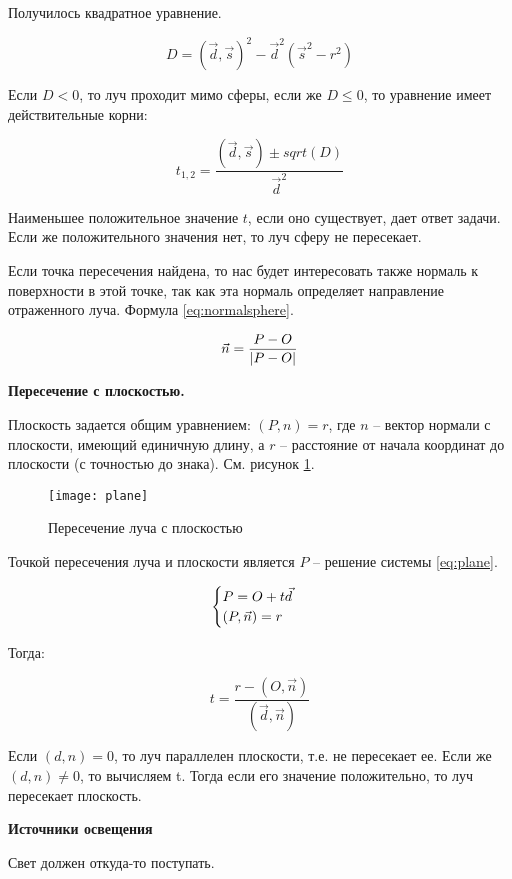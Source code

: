 Получилось квадратное уравнение. 

$$D = (\vec d, \vec s)^2- \vec d^2 (\vec s ^2- r^2)$$

Если $D < 0$, то луч проходит мимо сферы, если же $D \le 0$, то уравнение имеет действительные корни:

$$t_{1,2}=\frac{(\vec d, \vec s) \pm sqrt(D) }{\vec d^2}$$

Наименьшее положительное значение $t$, если оно существует, дает ответ задачи. Если же положительного значения нет, то луч сферу не пересекает.

Если точка пересечения найдена, то нас будет интересовать также нормаль к поверхности в этой точке, так как эта нормаль определяет направление отраженного луча. Формула \ref{eq:normalsphere}. 

\begin{equation}
	\centering
   		\vec n = \frac{P - O}{|P-O|}
	\label{eq:normalsphere}
\end{equation}

\textbf{Пересечение с плоскостью. }

Плоскость задается общим уравнением: $(P, n) = r$, где $n$ -- вектор нормали с плоскости, имеющий единичную длину, а $r$ -- расстояние от начала координат до плоскости (с точностью до знака). См. рисунок \ref{img:plane}. 

\begin{figure}[H]
	\centering
	\texttt{[image: plane]}
	\caption{Пересечение луча с плоскостью}
	\label{img:plane}
\end{figure}

Точкой пересечения луча и плоскости является $P$ -- решение системы  \ref{eq:plane}. 

\begin{equation}
	\centering
	\begin{cases}
   		P = O + t\vec d\\
   		(P, \vec n) = r
 	\end{cases}
	\label{eq:plane}
\end{equation}

Тогда:

$$t = \frac{r - (O, \vec n)}{(\vec d, \vec n)}$$

Если $(d,n) = 0$, то луч параллелен плоскости, т.е. не пересекает ее. Если же $(d,n) \ne 0$, то вычисляем t. Тогда если его значение положительно, то луч пересекает плоскость.

\textbf{Источники освещения}

Свет должен откуда-то поступать. 

